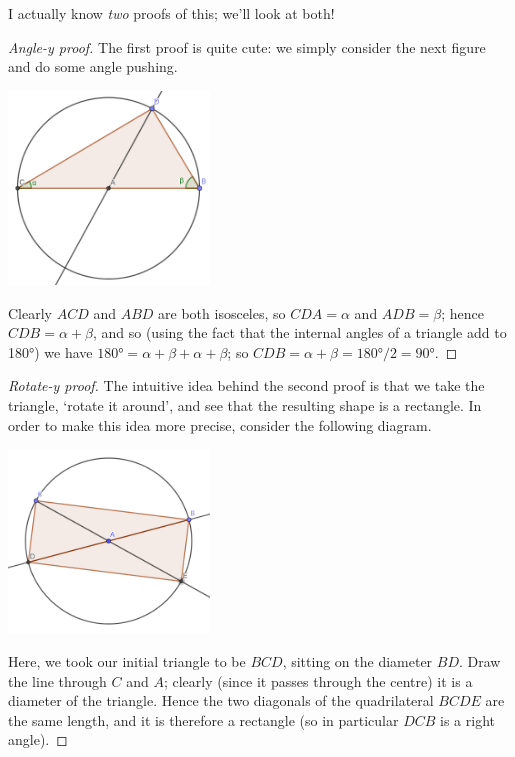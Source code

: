 I actually know \emph{two} proofs of this; we'll look at both!

\begin{proof}[Angle-y proof]
  The first proof is quite cute: we simply consider the next figure and do some angle pushing.
  \begin{center}
    \includegraphics[width=0.4\textwidth]{thales2}
  \end{center}
  Clearly $ ACD $ and $ ABD $ are both isosceles, so $ CDA = \alpha $ and $ ADB = \beta $; hence $ CDB = \alpha + \beta $,
  and so (using the fact that the internal angles of a triangle add to \ang{180}) we have $ \ang{180} = \alpha + \beta + \alpha + \beta $;
  so $ CDB = \alpha + \beta = \ang{180}/2 = \ang{90} $.
\end{proof}

\begin{proof}[Rotate-y proof]
  The intuitive idea behind the second proof is that we take the triangle, `rotate it around', and see that the resulting shape is a rectangle.
  In order to make this idea more precise, consider the following diagram.
  \begin{center}
    \includegraphics[width=0.4\textwidth]{thalesrotate}
  \end{center}
  Here, we took our initial triangle to be $ BCD $, sitting on the diameter $ BD $. Draw the line through $ C $ and $ A $; clearly (since it
  passes through the centre) it is a diameter of the triangle. Hence the two diagonals of the quadrilateral $ BCDE $ are the same length,
  and it is therefore a rectangle (so in particular $ DCB $ is a right angle).
\end{proof}

